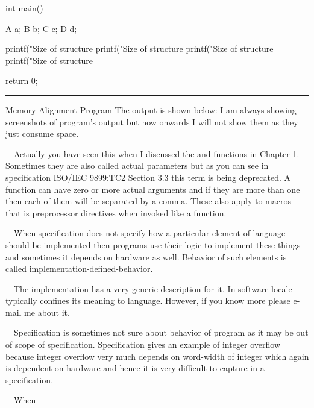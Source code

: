 int main()
{
  A a;
  B b;
  C c;
  D d;

  printf("Size of structure %
  printf("Size of structure %
  printf("Size of structure %
  printf("Size of structure %

  return 0;
}

\stopCPP
{}
\hrule\blank[force,1mm]
\startalignment[middle]
Memory Alignment Program
\stopalignment
The output is shown below:
\blank[force, 1mm]
I am always showing screenshots of program's output but now onwards I
will not show them as they just consume space.
\item{}\textreference[argument]~~Actually you have seen
  this when I discussed the  and  functions
  in Chapter 1. Sometimes they are also called actual parameters but
  as you can see in specification ISO/IEC 9899:TC2 Section 3.3 this
  term is being deprecated. A function can have zero or more actual
  arguments and if they are more than one then each of them will be
  separated by a comma. These also apply to macros that is
  preprocessor directives when invoked like a function.
\item{}~~When
  specification does not specify how a particular element of language
  should be implemented then programs use their logic to implement
  these things and sometimes it depends on hardware as well. Behavior
  of such elements is called implementation-defined-behavior.
\item{}~~The
  implementation has a very generic description for it. In software
  locale typically confines its meaning to language. However, if you
  know more please e-mail me about it.
\item{}~~Specification
  is sometimes not sure about behavior of program as it may be out of
  scope of specification. Specification gives an example of integer
  overflow because integer overflow very much depends on word-width of
  integer which again is dependent on hardware and hence it is very
  difficult to capture in a specification.
\item{}~~When
